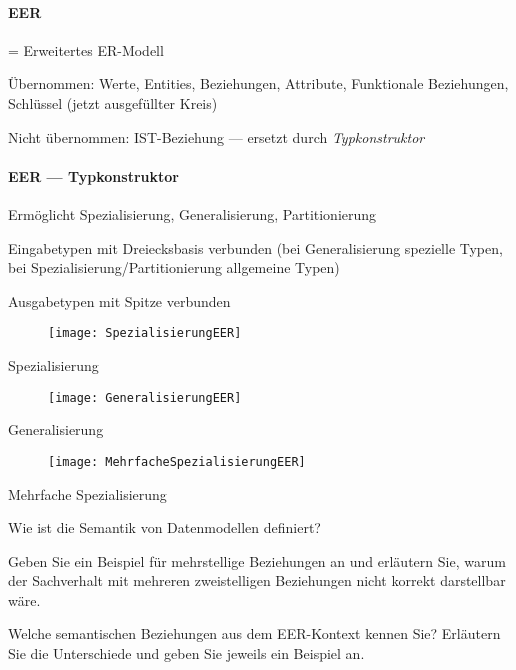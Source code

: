 \paragraph{EER}
\begin{items}
	\item = Erweitertes ER-Modell
	\item Übernommen: Werte, Entities, Beziehungen, Attribute, Funktionale Beziehungen, Schlüssel (jetzt ausgefüllter Kreis)
	\item Nicht übernommen: IST-Beziehung --- ersetzt durch \emph{Typkonstruktor}
\end{items}

\paragraph{EER --- Typkonstruktor}
\begin{items}
	\item Ermöglicht Spezialisierung, Generalisierung, Partitionierung
	\item Eingabetypen mit Dreiecksbasis verbunden (bei Generalisierung spezielle Typen, bei Spezialisierung/Partitionierung allgemeine Typen)
	\item Ausgabetypen mit Spitze verbunden
\end{items}
\begin{center}
	\begin{figure}[H]\centering\label{SpezialisierungEER}\texttt{[image: SpezialisierungEER]}\end{figure}
	Spezialisierung
	\begin{figure}[H]\centering\label{GeneralisierungEER}\texttt{[image: GeneralisierungEER]}\end{figure}
	Generalisierung
	\begin{figure}[H]\centering\label{MehrfacheSpezialisierungEER}\texttt{[image: MehrfacheSpezialisierungEER]}\end{figure}
	Mehrfache Spezialisierung
\end{center}

\begin{fragen}
	\item Wie ist die Semantik von Datenmodellen definiert?
	\item Geben Sie ein Beispiel für mehrstellige Beziehungen an und erläutern Sie, warum der Sachverhalt mit mehreren zweistelligen Beziehungen nicht korrekt darstellbar wäre.
	\item Welche semantischen Beziehungen aus dem EER-Kontext kennen Sie? Erläutern Sie die Unterschiede und geben Sie jeweils ein Beispiel an.
\end{fragen}
